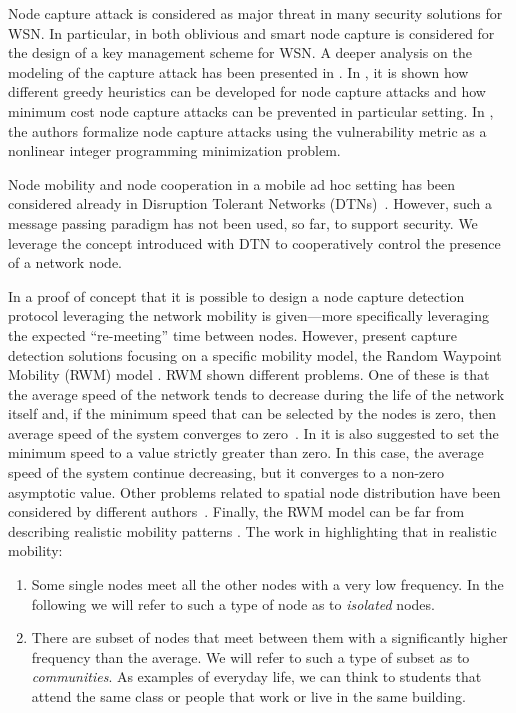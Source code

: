 \documentclass{IEEEconf}
\begin{document}
Node capture attack is considered as major threat in many security solutions for WSN.
In particular, in \cite{Huang:SASN04} both oblivious and smart node capture is considered for the design of a key management scheme for WSN. A deeper analysis on the modeling of the capture attack has been presented in \cite{Tague:AdHocElsevier:2007, Tague:Vulnerability:INFOCOM2008}. In \cite{Tague:AdHocElsevier:2007}, it is shown how different greedy heuristics can be developed for node capture attacks and how minimum cost node capture attacks can be prevented in particular setting. In \cite{Tague:Vulnerability:INFOCOM2008}, the authors formalize node capture attacks using the vulnerability metric as a nonlinear integer programming minimization problem.

Node mobility and node cooperation in a mobile ad hoc setting has been considered already in Disruption Tolerant Networks (DTNs)~\cite{Sterbenz:Survivable(DTN):WISE2002, Elizabeth:SocialNetwork:MobiHoc07}. However, such a message passing paradigm has not been used, so far, to support security. We leverage the concept introduced with DTN to cooperatively control the presence of a network node.

In \cite{CDMM:WiSec08:Emergent, CDMM:EURASIP:2009} a proof of concept that it is possible to design a node capture detection protocol leveraging the network mobility is given---more specifically leveraging the expected ``re-meeting'' time between nodes.
However, \cite{CDMM:WiSec08:Emergent, CDMM:EURASIP:2009} present capture detection solutions focusing on a specific mobility model, the Random Waypoint Mobility (RWM) model \cite{Broch:RWM:MobiCom98}.
RWM shown different problems. One of these is that the average speed of the network tends to decrease during the life of the network itself and, if the minimum speed that can be selected by the nodes is zero, then average speed of the system converges to zero~\cite{yoon03random}.
In \cite{yoon03random} it is also suggested to set the minimum speed to a value strictly greater than zero. In this case, the average speed of the system continue decreasing, but it converges to a non-zero asymptotic value. Other problems related to spatial node distribution have been considered by different authors~\cite{Esa:SpatialDistributionRWM,yoon03random, Resta:AnAnalysisOfTheNode_POMC02}.
Finally, the RWM model can be far from describing realistic mobility patterns \cite{Esa:SpatialDistributionRWM,yoon03random, CDGMM:WWIC:TheQuest}. The work in \cite{CDGMM:WWIC:TheQuest} highlighting that in realistic mobility:
\begin{enumerate}
\item Some single nodes meet all the other nodes with a very low frequency. In the following we will refer to such a type of node as to \textit{isolated} nodes.
\item There are subset of nodes that meet between them with a significantly higher frequency than the average. We will refer to such a type of subset as to \textit{communities}. As examples of everyday life, we can think to students that attend the same class or people that work or live in the same building.
\end{enumerate}
\end{document}
